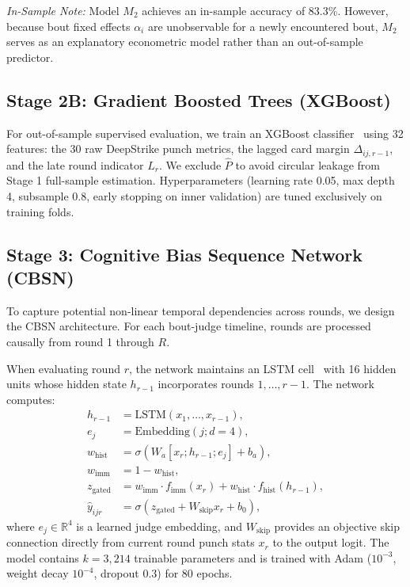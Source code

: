 \documentclass[conference]{IEEEtran}
\begin{document}
\textit{In-Sample Note:} Model $M_2$ achieves an in-sample accuracy of 83.3\%. However, because bout fixed effects $\alpha_i$ are unobservable for a newly encountered bout, $M_2$ serves as an explanatory econometric model rather than an out-of-sample predictor.

\subsection{Stage 2B: Gradient Boosted Trees (XGBoost)}
For out-of-sample supervised evaluation, we train an XGBoost classifier~\cite{chen2016xgboost} using 32 features: the 30 raw DeepStrike punch metrics, the lagged card margin $\Delta_{ij,r-1}$, and the late round indicator $L_r$. We exclude $\hat{P}$ to avoid circular leakage from Stage 1 full-sample estimation. Hyperparameters (learning rate 0.05, max depth 4, subsample 0.8, early stopping on inner validation) are tuned exclusively on training folds.

\subsection{Stage 3: Cognitive Bias Sequence Network (CBSN)}
To capture potential non-linear temporal dependencies across rounds, we design the CBSN architecture. For each bout-judge timeline, rounds are processed causally from round 1 through $R$. 

When evaluating round $r$, the network maintains an LSTM cell~\cite{hochreiter1997} with 16 hidden units whose hidden state $h_{r-1}$ incorporates rounds $1, \dots, r-1$. The network computes:
\begin{align}
h_{r-1} &= \text{LSTM}(x_1, \dots, x_{r-1}), \\
e_j &= \text{Embedding}(j; d=4), \\
w_{\text{hist}} &= \sigma\left( W_a [x_r; h_{r-1}; e_j] + b_a \right), \\
w_{\text{imm}} &= 1 - w_{\text{hist}}, \\
z_{\text{gated}} &= w_{\text{imm}} \cdot f_{\text{imm}}(x_r) + w_{\text{hist}} \cdot f_{\text{hist}}(h_{r-1}), \\
\hat{y}_{ijr} &= \sigma\left( z_{\text{gated}} + W_{\text{skip}} x_r + b_0 \right),
\end{align}
where $e_j \in \mathbb{R}^4$ is a learned judge embedding, and $W_{\text{skip}}$ provides an objective skip connection directly from current round punch stats $x_r$ to the output logit. The model contains $k = 3,214$ trainable parameters and is trained with Adam ($10^{-3}$, weight decay $10^{-4}$, dropout 0.3) for 80 epochs.
\end{document}
